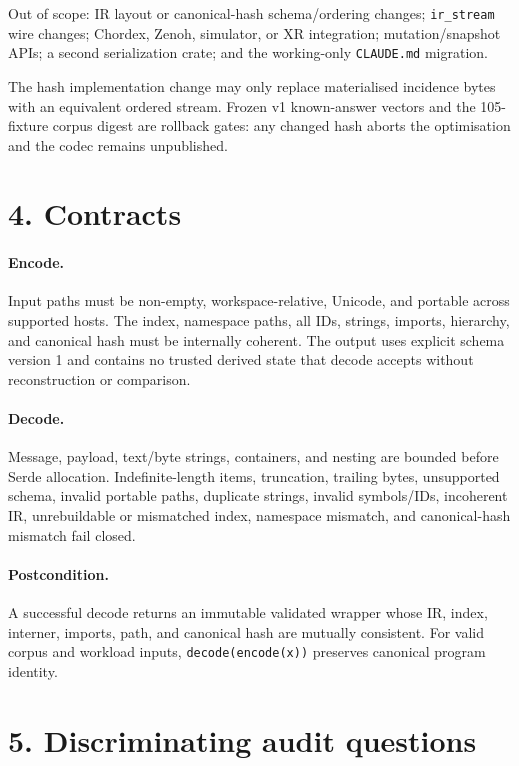 \documentclass[11pt,a4paper]{article}
\begin{document}
Out of scope: IR layout or canonical-hash schema/ordering changes; \texttt{ir\_stream} wire changes;
Chordex, Zenoh, simulator, or XR integration; mutation/snapshot APIs; a second serialization crate;
and the working-only \texttt{CLAUDE.md} migration.

The hash implementation change may only replace materialised incidence bytes with an equivalent
ordered stream. Frozen v1 known-answer vectors and the 105-fixture corpus digest are rollback gates:
any changed hash aborts the optimisation and the codec remains unpublished.

\section*{4. Contracts}

\paragraph{Encode.} Input paths must be non-empty, workspace-relative, Unicode, and portable across
supported hosts. The index, namespace paths, all IDs, strings, imports, hierarchy, and canonical hash
must be internally coherent. The output uses explicit schema version 1 and contains no trusted
derived state that decode accepts without reconstruction or comparison.

\paragraph{Decode.} Message, payload, text/byte strings, containers, and nesting are bounded before
Serde allocation. Indefinite-length items, truncation, trailing bytes, unsupported schema, invalid
portable paths, duplicate strings, invalid symbols/IDs, incoherent IR, unrebuildable or mismatched
index, namespace mismatch, and canonical-hash mismatch fail closed.

\paragraph{Postcondition.} A successful decode returns an immutable validated wrapper whose IR,
index, interner, imports, path, and canonical hash are mutually consistent. For valid corpus and
workload inputs, \texttt{decode(encode(x))} preserves canonical program identity.

\section*{5. Discriminating audit questions}
\end{document}
